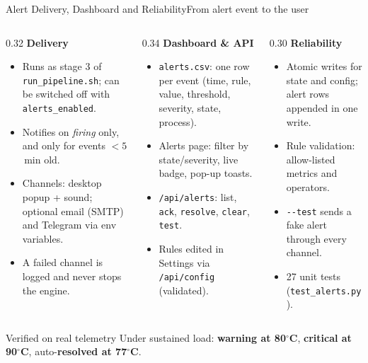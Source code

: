 \documentclass[aspectratio=169,10pt]{beamer}
\begin{document}
\begin{frame}{Alert Delivery, Dashboard and Reliability}{From alert event to the user}
\footnotesize
\begin{columns}[T]
\begin{column}{0.32\textwidth}
\textbf{Delivery}
\begin{itemize}
  \item Runs as stage 3 of \texttt{run\_pipeline.sh}; can be switched off with \texttt{alerts\_enabled}.
  \item Notifies on \textit{firing} only, and only for events $<5$\,min old.
  \item Channels: desktop popup + sound; optional email (SMTP) and Telegram via env variables.
  \item A failed channel is logged and never stops the engine.
\end{itemize}
\end{column}
\begin{column}{0.34\textwidth}
\textbf{Dashboard \& API}
\begin{itemize}
  \item \texttt{alerts.csv}: one row per event (time, rule, value, threshold, severity, state, process).
  \item Alerts page: filter by state/severity, live badge, pop-up toasts.
  \item \texttt{/api/alerts}: list, \texttt{ack}, \texttt{resolve}, \texttt{clear}, \texttt{test}.
  \item Rules edited in Settings via \texttt{/api/config} (validated).
\end{itemize}
\end{column}
\begin{column}{0.30\textwidth}
\textbf{Reliability}
\begin{itemize}
  \item Atomic writes for state and config; alert rows appended in one write.
  \item Rule validation: allow-listed metrics and operators.
  \item \texttt{-{}-test} sends a fake alert through every channel.
  \item 27 unit tests (\texttt{test\_alerts.py}).
\end{itemize}
\end{column}
\end{columns}

\vspace{0.4em}
\begin{block}{Verified on real telemetry}
Under sustained load: \textbf{warning at 80$^\circ$C}, \textbf{critical at 90$^\circ$C}, auto-\textbf{resolved at 77$^\circ$C}.
\end{block}
\end{frame}
\end{document}
